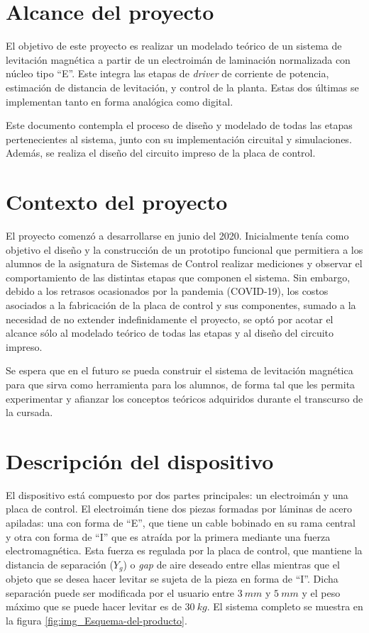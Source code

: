 \section{Alcance del proyecto}

\noindent El objetivo de este proyecto es realizar un modelado teórico de un sistema de levitación magnética a partir de un electroimán de laminación normalizada con núcleo tipo “E''. Este integra las etapas de \textsl{driver} de corriente de potencia, estimación de distancia de levitación, y control de la planta. Estas dos últimas se implementan tanto en forma analógica como digital.

\noindent Este documento contempla el proceso de diseño y modelado de todas las etapas pertenecientes al sistema, junto con su implementación circuital y simulaciones. Además, se realiza el diseño del circuito impreso de la placa de control.



\section{Contexto del proyecto}

\noindent El proyecto comenzó a desarrollarse en junio del 2020. Inicialmente tenía como objetivo el diseño y la construcción de un prototipo funcional que permitiera a los alumnos de la asignatura de Sistemas de Control realizar mediciones y observar el comportamiento de las distintas etapas que componen el sistema. Sin embargo, debido a los retrasos ocasionados por la pandemia (COVID-19), los costos asociados a la fabricación de la placa de control y sus componentes, sumado a la  necesidad de no extender indefinidamente el proyecto, se optó por acotar el alcance sólo al modelado teórico de todas las etapas y al diseño del circuito impreso.

\noindent Se espera que en el futuro se pueda construir el sistema de levitación magnética para que sirva como herramienta para los alumnos, de forma tal que les permita experimentar y afianzar los conceptos teóricos adquiridos durante el transcurso de la cursada.



\section{Descripción del dispositivo}

\noindent El dispositivo está compuesto por dos partes principales: un electroimán y una placa de control. El electroimán tiene dos piezas formadas por láminas de acero apiladas: una con forma de “E”, que tiene un cable bobinado en su rama central y otra con forma de “I” que es atraída por la primera mediante una fuerza electromagnética. Esta fuerza es regulada por la placa de control, que mantiene la distancia de separación ($Y_{g}$) o \textsl{gap} de aire deseado entre ellas mientras que el objeto que se desea hacer levitar se sujeta de la pieza en forma de “I”. Dicha separación puede ser modificada por el usuario entre $3\:mm$ y $5\:mm$ y el peso máximo que se puede hacer levitar es de $30\:kg$. El sistema completo se muestra en la figura \ref{fig:img_Esquema-del-producto}.

